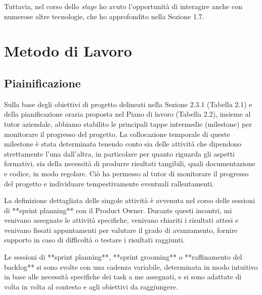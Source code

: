         Tuttavia, nel corso dello \textit{stage} ho avuto l’opportunità di interagire anche con numerose altre tecnologie, che ho approfondito nella Sezione 1.7.

    \section{Metodo di Lavoro}
        \subsection{Piainificazione}
        
        Sulla base degli obiettivi di progetto delineati nella Sezione 2.3.1 (Tabella 2.1) e della pianificazione oraria proposta nel Piano di lavoro (Tabella 2.2), insieme al tutor aziendale, abbiamo stabilito le principali tappe intermedie (milestone) per monitorare il progresso del progetto. La collocazione temporale di queste milestone è stata determinata tenendo conto sia delle attività che dipendono strettamente l'una dall'altra, in particolare per quanto riguarda gli aspetti formativi, sia della necessità di produrre risultati tangibili, quali documentazione e codice, in modo regolare. Ciò ha permesso al tutor di monitorare il progresso del progetto e individuare tempestivamente eventuali rallentamenti.

        La definizione dettagliata delle singole attività è avvenuta nel corso delle sessioni di **sprint planning** con il Product Owner. Durante questi incontri, mi venivano assegnate le attività specifiche, venivano chiariti i risultati attesi e venivano fissati appuntamenti per valutare il grado di avanzamento, fornire supporto in caso di difficoltà o testare i risultati raggiunti. 

        Le sessioni di **sprint planning**, **sprint grooming** o **raffinamento del backlog** si sono svolte con una cadenza variabile, determinata in modo intuitivo in base alle necessità specifiche dei task a me assegnati, e si sono adattate di volta in volta al contesto e agli obiettivi da raggiungere.

